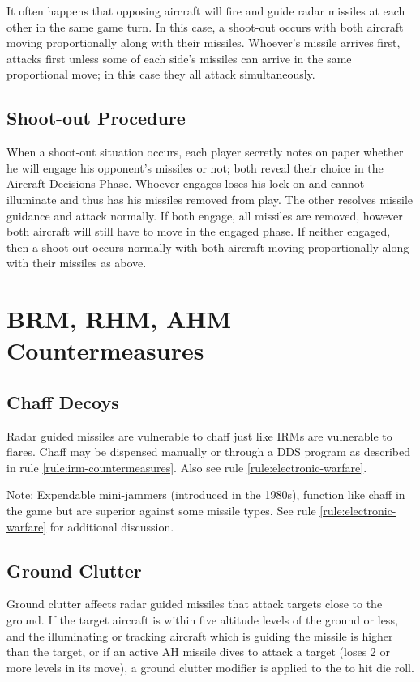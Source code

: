It often happens that opposing aircraft will fire and guide radar missiles at each other in the same game turn. In this case, a shoot-out occurs with both aircraft moving proportionally along with their missiles. Whoever’s missile arrives first, attacks first unless some of each side's missiles can arrive in the same proportional move; in this case they all attack simultaneously.

\subsection{Shoot-out Procedure} When a shoot-out situation occurs, each player secretly notes on paper whether he will engage his opponent's missiles or not; both reveal their choice in the Aircraft Decisions Phase. Whoever engages loses his lock-on and cannot illuminate and thus has his missiles removed from play. The other resolves missile guidance and attack normally. If both engage, all missiles are removed, however both aircraft will still have to move in the engaged phase. If neither engaged, then a shoot-out occurs normally with both aircraft moving proportionally along with their missiles as above.

\section{BRM, RHM, AHM Countermeasures}

\subsection{Chaff Decoys} Radar guided missiles are vulnerable to chaff just like IRMs are vulnerable to flares. Chaff may be dispensed manually or through a DDS program as described in rule \ref{rule:irm-countermeasures}. Also see rule \ref{rule:electronic-warfare}.

Note: Expendable mini-jammers (introduced in the 1980s), function like chaff in the game but are superior against some missile types. See rule \ref{rule:electronic-warfare} for additional discussion.

\subsection{Ground Clutter}\label{rule:rgm-ground-clutter} Ground clutter affects radar guided missiles that attack targets close to the ground. If the target aircraft is within five altitude levels of the ground or less, and the illuminating or tracking aircraft which is guiding the missile is higher than the target, or if an active AH missile dives to attack a target (loses 2 or more levels in its move), a ground clutter modifier is applied to the to hit die roll.

